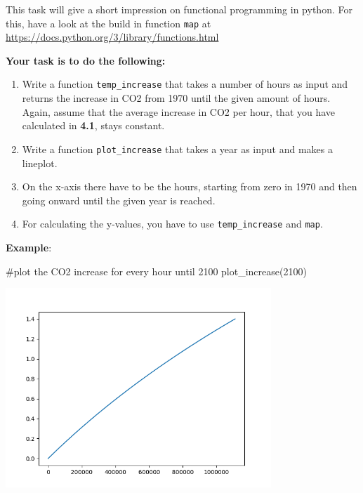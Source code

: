 This task will give a short impression on functional programming in python. For this, have a look at the build in function \texttt{map} at \href{https://docs.python.org/3/library/functions.html}{https://docs.python.org/3/library/functions.html}

\vspace{1em}

\noindent \textbf{Your task is to do the following:} 

    \begin{enumerate}

        \item Write a function \texttt{temp\_increase} that takes a number of hours as input and returns the increase in CO2 from 1970 until the given amount of hours. Again, assume that the average increase in CO2 per hour, that you have calculated in \textbf{4.1}, stays constant.
        \item Write a function \texttt{plot\_increase} that takes a year as input and makes a lineplot. 
        \item On the x-axis there have to be the hours, starting from zero in 1970 and then going onward until the given year is reached.
        \item For calculating the y-values, you have to use \texttt{temp\_increase} and \texttt{map}.

    \end{enumerate}

\vspace{1em}

\noindent \textbf{Example}:

\begin{pythoncode}

#plot the CO2 increase for every hour until 2100
plot_increase(2100)

\end{pythoncode}

\includegraphics[width=10cm]{08_Standard_Library/temperature_2100.png}

